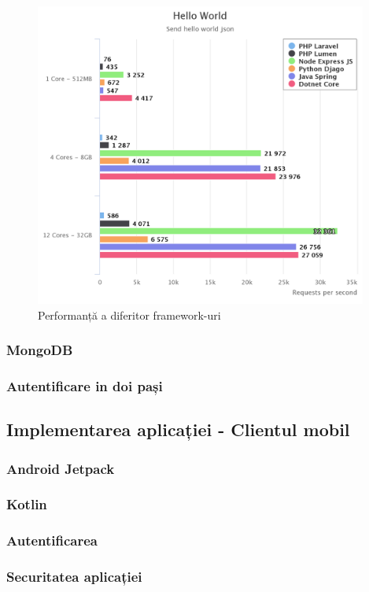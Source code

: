 \documentclass[12pt]{article}
\begin{document}
\begin{figure}[H]
\centering
\includegraphics[height=10cm]{nodespeed.png}
\caption{Performanță a diferitor framework-uri \cite{reqpersec}}
\end{figure}
    
\subsubsection{MongoDB}
\subsubsection{Autentificare in doi pași}

\subsection{Implementarea aplicației - Clientul mobil}
\subsubsection{Android Jetpack}
\subsubsection{Kotlin}
\subsubsection{Autentificarea}
\subsubsection{Securitatea aplicației}
\end{document}
